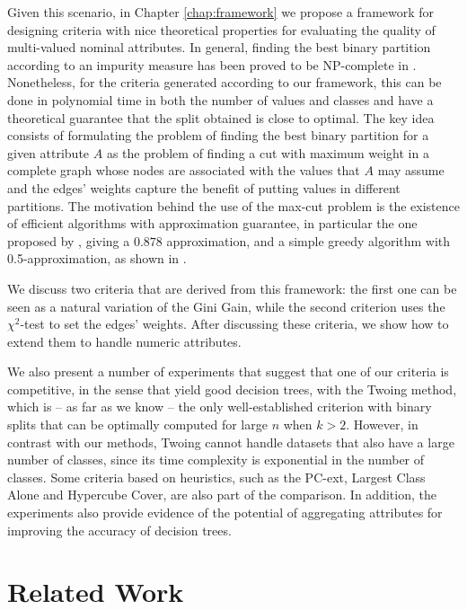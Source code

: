 Given this scenario,  in Chapter \ref{chap:framework} we propose
a framework for designing criteria with nice theoretical properties for evaluating the quality of 
 multi-valued nominal attributes. In general, finding the best binary partition according to an impurity measure has been proved to be NP-complete in \cite{icml2018}. Nonetheless, for the criteria generated according to our framework, this can be done in polynomial time in both the number of values and classes and
have a theoretical guarantee that the split obtained is close to optimal.
The key idea consists of formulating the problem
of finding the best binary partition for a given attribute $A$ as the  problem of finding a 
cut with maximum weight  in a complete graph whose nodes are associated with the values that $A$ may assume and the edges' weights capture the benefit of putting
values in different partitions. The  motivation behind the use of the max-cut problem is 
the existence of efficient algorithms with 
approximation guarantee, in particular 
the one proposed  by \cite{GoeWil95}, giving a $0.878$ approximation,
and a simple greedy algorithm with 0.5-approximation, as shown in \cite{gonzalez2007handbook}.


We discuss two criteria that are derived from this framework:
the first one  can be seen as a natural variation of the
Gini Gain, while the second criterion uses the $\chi^2$-test  to set the edges' weights.
After discussing these criteria, we show how to extend them to handle
numeric attributes.

We also  present a number of experiments that suggest that one of our criteria is competitive, in the sense that yield good decision trees, with the Twoing method, which is -- as far as we know -- the only well-established criterion with binary splits that can be optimally computed for large $n$ when $k > 2$. However, in contrast with our methods, Twoing cannot handle datasets that also have a large number of classes, since its time complexity is exponential in the number of classes. Some criteria based on heuristics, such as the PC-ext, Largest Class Alone and Hypercube Cover, are also part of the comparison. In addition, the experiments also  provide evidence of the potential of aggregating  attributes for improving the accuracy of decision trees.

\section{Related Work}
\label{chap:relatedwork}

